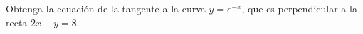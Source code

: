 \item Obtenga la ecuación de la tangente a la curva $y = e^{-x}$, que es perpendicular a la recta $2x - y = 8$.

